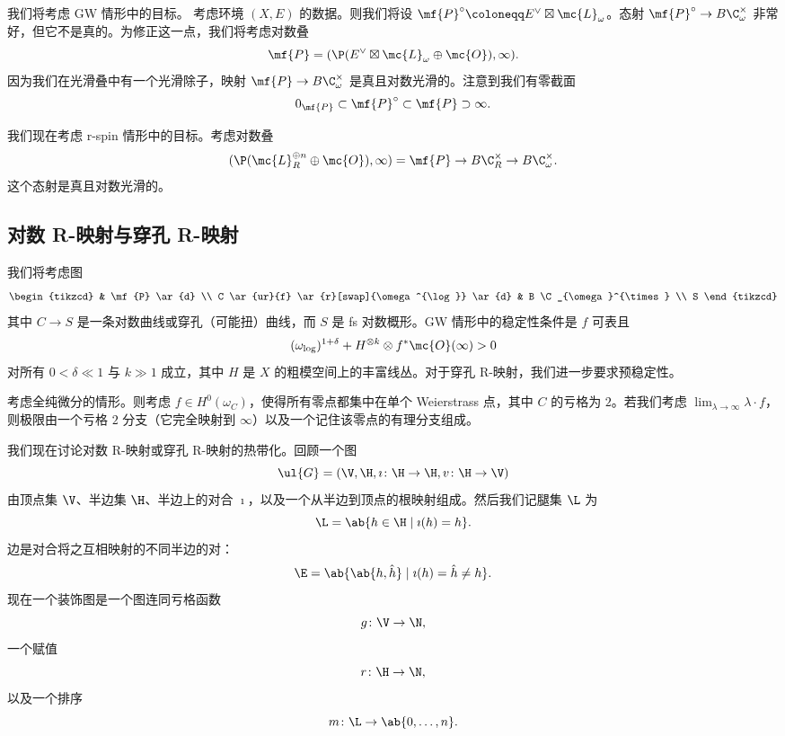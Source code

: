 我们将考虑 GW 情形中的目标。
考虑环境 \((X, E)\) 的数据。则我们将设 \(\mf{P}^{\circ} \coloneqq E^{\vee} \boxtimes \mc{L}_{\omega}\)。态射 \(\mf{P}^{\circ} \to B \C_{\omega}^{\times}\) 非常好，但它不是真的。为修正这一点，我们将考虑对数叠
\[ \mf{P} = ( \P(E^{\vee} \boxtimes \mc{L}_{\omega} \oplus \mc{O}) , \infty). \]
因为我们在光滑叠中有一个光滑除子，映射 \(\mf{P} \to B \C_{\omega}^{\times}\) 是真且对数光滑的。注意到我们有零截面
\[ 0_{\mf{P}} \subset \mf{P}^{\circ} \subset \mf{P} \supset \infty. \]

我们现在考虑 r-spin 情形中的目标。考虑对数叠
\[ (\P(\mc{L}_R^{\oplus n} \oplus \mc{O}), \infty) = \mf{P} \to B \C_R^{\times} \to B \C_{\omega}^{\times}. \]
这个态射是真且对数光滑的。

\subsection{对数 R-映射与穿孔 R-映射}%
\label{sub:Log and punctured R-maps}

我们将考虑图
\begin{equation*}
\begin{tikzcd}
    & \mf{P} \ar{d} \\
    C \ar{ur}{f} \ar{r}[swap]{\omega^{\log}} \ar{d} & B \C_{\omega}^{\times} \\
    S
\end{tikzcd}
\end{equation*}
其中 \(C \to S\) 是一条对数曲线或穿孔（可能扭）曲线，而 \(S\) 是 fs 对数概形。GW 情形中的稳定性条件是 \(f\) 可表且
\[ (\omega_{\log})^{1+\delta} + H^{\otimes k} \otimes f^* \mc{O}(\infty) > 0 \]
对所有 \(0 < \delta \ll 1\) 与 \(k \gg 1\) 成立，其中 \(H\) 是 \(X\) 的粗模空间上的丰富线丛。对于穿孔 R-映射，我们进一步要求预稳定性。

\begin{exm}
    考虑全纯微分的情形。则考虑 \(f \in H^0(\omega_C)\)，使得所有零点都集中在单个 Weierstrass 点，其中 \(C\) 的亏格为 \(2\)。若我们考虑 \(\lim_{\lambda \to \infty} \lambda \cdot f\)，则极限由一个亏格 \(2\) 分支（它完全映射到 \(\infty\)）以及一个记住该零点的有理分支组成。
\end{exm}

我们现在讨论对数 R-映射或穿孔 R-映射的热带化。回顾一个图
\[ \ul{G} = (\V, \H, \imath \colon \H \to \H, v \colon \H \to \V) \]
由顶点集 \(\V\)、半边集 \(\H\)、半边上的对合 \(\imath\)，以及一个从半边到顶点的根映射组成。然后我们记腿集 \(\L\) 为
\[ \L = \ab\{ h \in \H \mid \imath(h) = h\}. \]
边是对合将之互相映射的不同半边的对：
\[ \E = \ab\{ \ab\{h, \hat{h}\} \mid \imath(h) = \hat{h} \neq h \}. \]
现在一个装饰图是一个图连同亏格函数
\[ g \colon \V \to \N, \]
一个赋值
\[ r \colon \H \to \N, \]
以及一个排序
\[ m \colon \L \to \ab\{0, \ldots, n\}. \]

